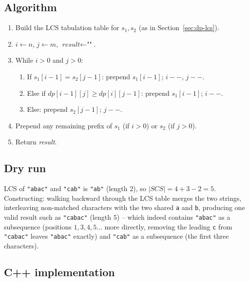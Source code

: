 \subsection*{Algorithm}

\begin{enumerate}
  \item Build the LCS tabulation table for $s_1, s_2$ (as in
        Section~\ref{sec:dp-lcs}).
  \item $i \gets n$, $j \gets m$, $\textit{result} \gets \texttt{""}$.
  \item While $i>0$ and $j>0$:
  \begin{enumerate}
    \item If $s_1[i-1]=s_2[j-1]$: prepend $s_1[i-1]$; $i{-}{-}$,
          $j{-}{-}$.
    \item Else if $\textit{dp}[i-1][j] \ge \textit{dp}[i][j-1]$:
          prepend $s_1[i-1]$; $i{-}{-}$.
    \item Else: prepend $s_2[j-1]$; $j{-}{-}$.
  \end{enumerate}
  \item Prepend any remaining prefix of $s_1$ (if $i>0$) or $s_2$ (if
        $j>0$).
  \item Return \textit{result}.
\end{enumerate}

\subsection*{Dry run}


LCS of \texttt{"abac"} and \texttt{"cab"} is \texttt{"ab"} (length $2$),
so $|\textit{SCS}| = 4+3-2 = 5$. Constructing: walking backward through
the LCS table merges the two strings, interleaving non-matched
characters with the two shared \texttt{a} and \texttt{b}, producing one
valid result such as \texttt{"cabac"} (length $5$) -- which indeed
contains \texttt{"abac"} as a subsequence (positions $1,3,4,5$... more
directly, removing the leading \texttt{c} from \texttt{"cabac"} leaves
\texttt{"abac"} exactly) and \texttt{"cab"} as a subsequence (the first
three characters).

\subsection*{C++ implementation}

